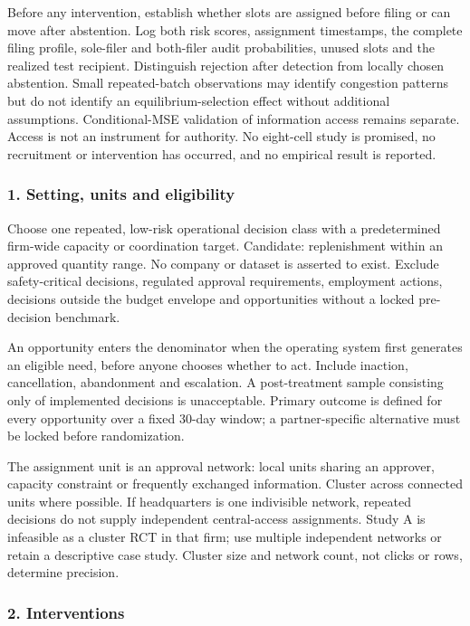 \documentclass[
  11pt,
]{article}
\begin{document}
Before any intervention, establish whether slots are assigned before
filing or can move after abstention. Log both risk scores, assignment
timestamps, the complete filing profile, sole-filer and both-filer audit
probabilities, unused slots and the realized test recipient. Distinguish
rejection after detection from locally chosen abstention. Small
repeated-batch observations may identify congestion patterns but do not
identify an equilibrium-selection effect without additional assumptions.
Conditional-MSE validation of information access remains separate.
Access is not an instrument for authority. No eight-cell study is
promised, no recruitment or intervention has occurred, and no empirical
result is reported.

\subsubsection{1. Setting, units and
eligibility}\label{setting-units-and-eligibility}

Choose one repeated, low-risk operational decision class with a
predetermined firm-wide capacity or coordination target. Candidate:
replenishment within an approved quantity range. No company or dataset
is asserted to exist. Exclude safety-critical decisions, regulated
approval requirements, employment actions, decisions outside the budget
envelope and opportunities without a locked pre-decision benchmark.

An opportunity enters the denominator when the operating system first
generates an eligible need, before anyone chooses whether to act.
Include inaction, cancellation, abandonment and escalation. A
post-treatment sample consisting only of implemented decisions is
unacceptable. Primary outcome is defined for every opportunity over a
fixed 30-day window; a partner-specific alternative must be locked
before randomization.

The assignment unit is an approval network: local units sharing an
approver, capacity constraint or frequently exchanged information.
Cluster across connected units where possible. If headquarters is one
indivisible network, repeated decisions do not supply independent
central-access assignments. Study A is infeasible as a cluster RCT in
that firm; use multiple independent networks or retain a descriptive
case study. Cluster size and network count, not clicks or rows,
determine precision.

\subsubsection{2. Interventions}\label{interventions}
\end{document}
